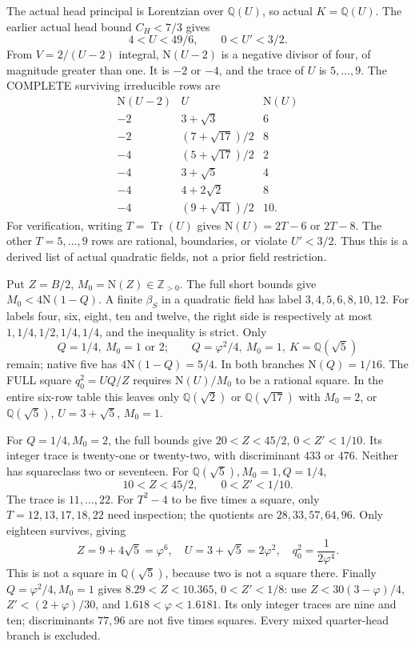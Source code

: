 \documentclass[11pt]{article}
\begin{document}
The actual head principal is Lorentzian over \(\mathbb Q(U)\),
so actual \(K=\mathbb Q(U)\).
The earlier actual head bound \(C_H<7/3\) gives
\[
                   4<U<49/6,\qquad 0<U'<3/2 .
\]
From \(V=2/(U-2)\) integral,
\(\mathrm N(U-2)\) is a negative divisor of four,
of magnitude greater than one.
It is \(-2\) or \(-4\), and the trace of \(U\) is
\(5,\ldots,9\).
The COMPLETE surviving irreducible rows are
\[
\begin{array}{c|c|c}
 \mathrm N(U-2)&U&\mathrm N(U)\\ \hline
 -2&3+\sqrt3&6\\
 -2&(7+\sqrt{17})/2&8\\
 -4&(5+\sqrt{17})/2&2\\
 -4&3+\sqrt5&4\\
 -4&4+2\sqrt2&8\\
 -4&(9+\sqrt{41})/2&10 .
\end{array}
\]
For verification, writing \(T=\operatorname{Tr}(U)\)
gives \(\mathrm N(U)=2T-6\) or \(2T-8\).
The other \(T=5,\ldots,9\) rows are rational,
boundaries, or violate \(U'<3/2\).
Thus this is a derived list of actual quadratic
fields, not a prior field restriction.

Put \(Z=B/2\), \(M_0=\mathrm N(Z)\in\mathbb Z_{>0}\).
The full short bounds give \(M_0<4\mathrm N(1-Q)\).
A finite \(\beta_S\) in a quadratic field has
label \(3,4,5,6,8,10,12\).
For labels four, six, eight, ten and twelve, the
right side is respectively at most
\(1,1/4,1/2,1/4,1/4\), and the inequality is strict.
Only
\[
 Q=1/4,\ M_0=1\text{ or }2;\qquad
 Q=\varphi^2/4,\ M_0=1,\ K=\mathbb Q(\sqrt5)
\]
remain; native five has \(4\mathrm N(1-Q)=5/4\).
In both branches \(\mathrm N(Q)=1/16\).
The FULL square \(q_0^2=UQ/Z\) requires
\(\mathrm N(U)/M_0\) to be a rational square.
In the entire six-row table this leaves only
\(\mathbb Q(\sqrt2)\) or \(\mathbb Q(\sqrt{17})\)
with \(M_0=2\), or
\(\mathbb Q(\sqrt5)\), \(U=3+\sqrt5\), \(M_0=1\).

For \(Q=1/4,M_0=2\), the full bounds give
\(20<Z<45/2\), \(0<Z'<1/10\).
Its integer trace is twenty-one or twenty-two,
with discriminant \(433\) or \(476\).
Neither has squareclass two or seventeen.
For \(\mathbb Q(\sqrt5),M_0=1,Q=1/4\),
\[
                   10<Z<45/2,\qquad 0<Z'<1/10.
\]
The trace is \(11,\ldots,22\).
For \(T^2-4\) to be five times a square, only
\(T=12,13,17,18,22\) need inspection;
the quotients are \(28,33,57,64,96\).
Only eighteen survives, giving
\[
 Z=9+4\sqrt5=\varphi^6,\quad
 U=3+\sqrt5=2\varphi^2,\quad
 q_0^2={\frac{1}{2\varphi^4}}.
\]
This is not a square in \(\mathbb Q(\sqrt5)\),
because two is not a square there.
Finally \(Q=\varphi^2/4,M_0=1\) gives
\(8.29<Z<10.365\), \(0<Z'<1/8\):
use \(Z<30(3-\varphi)/4\),
\(Z'<(2+\varphi)/30\), and
\(1.618<\varphi<1.6181\).
Its only integer traces are nine and ten;
discriminants \(77,96\) are not five times squares.
Every mixed quarter-head branch is excluded.
\end{document}
